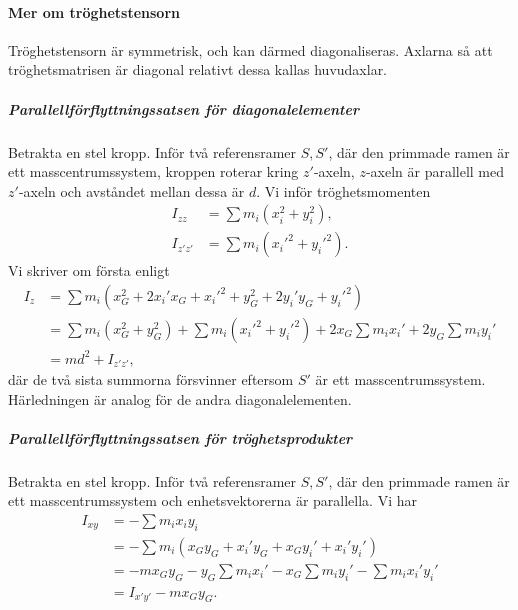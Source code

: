 \paragraph{Mer om tröghetstensorn}
Tröghetstensorn är symmetrisk, och kan därmed diagonaliseras. Axlarna så att tröghetsmatrisen är diagonal relativt dessa kallas huvudaxlar.

\subparagraph{Parallellförflyttningssatsen för diagonalelementer}
Betrakta en stel kropp. Inför två referensramer $S, S'$, där den primmade ramen är ett masscentrumssystem, kroppen roterar kring $z'$-axeln, $z$-axeln är parallell med $z'$-axeln och avståndet mellan dessa är $d$. Vi inför tröghetsmomenten
\begin{align*}
	I_{zz}   &= \sum m_{i}(x_{i}^2 + y_{i}^2), \\
	I_{z'z'} &= \sum m_{i}(x_{i}'^2 + y_{i}'^2).
\end{align*}
Vi skriver om första enligt
\begin{align*}
	I_{z} &= \sum m_{i}(x_{G}^2 + 2x_{i}'x_{G} + x_{i}'^{2} + y_{G}^2 + 2y_{i}'y_{G} + y_{i}'^{2}) \\
	      &= \sum m_{i}(x_{G}^2 + y_{G}^2) + \sum m_{i}(x_{i}'^{2} + y_{i}'^{2}) + 2x_{G}\sum m_{i}x_{i}' + 2y_{G}\sum m_{i}y_{i}' \\
	      &= md^2 + I_{z'z'},
\end{align*}
där de två sista summorna försvinner eftersom $S'$ är ett masscentrumssystem. Härledningen är analog för de andra diagonalelementen.

\subparagraph{Parallellförflyttningssatsen för tröghetsprodukter}
Betrakta en stel kropp. Inför två referensramer $S, S'$, där den primmade ramen är ett masscentrumssystem och enhetsvektorerna är parallella. Vi har
\begin{align*}
	I _{xy} &= -\sum m_{i}x_{i}y_{i} \\
	        &= -\sum m_{i}(x_{G}y_{G} + x_{i}'y_{G} + x_{G}y_{i}' + x_{i}'y_{i}') \\
	        &= -mx_{G}y_{G} - y_{G}\sum m_{i}x_{i}' - x_{G}\sum m_{i}y_{i}' - \sum m_{i}x_{i}'y_{i}' \\
	        &= I_{x'y'} - mx_{G}y_{G}.
\end{align*}

